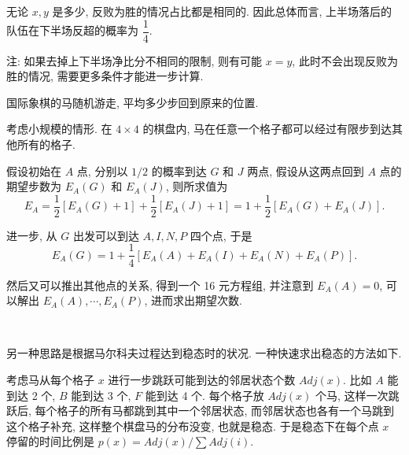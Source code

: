 无论 $x,y$ 是多少, 反败为胜的情况占比都是相同的. 因此总体而言, 上半场落后的队伍在下半场反超的概率为 $\dfrac{1}{4}$.

注: 如果去掉上下半场净比分不相同的限制, 则有可能 $x=y$, 此时不会出现反败为胜的情况, 需要更多条件才能进一步计算.


\newpage

国际象棋的马随机游走, 平均多少步回到原来的位置.
\begin{figure*}[htbp]
\centering
{}
\end{figure*}

考虑小规模的情形. 在 $ 4\times 4 $ 的棋盘内, 马在任意一个格子都可以经过有限步到达其他所有的格子. 

假设初始在 $ A $ 点, 分别以 $ 1/2 $ 的概率到达 $ G $ 和 $ J $ 两点, 假设从这两点回到 $ A $ 点的期望步数为 $ E_A(G) $ 和 $ E_A(J) $, 则所求值为 
\[ E_A = \frac{1}{2}[E_A(G) + 1] + \frac{1}{2}[E_A(J)+1] = 1 + \frac{1}{2}[E_A(G)+E_A(J)]. \]

进一步, 从 $ G $ 出发可以到达 $ A, I, N, P $ 四个点, 于是
\[ E_A(G)= 1+\frac{1}{4}[ E_A(A) + E_A(I) + E_A(N) + E_A(P) ]. \]

然后又可以推出其他点的关系, 得到一个 16 元方程组, 并注意到 $ E_A(A)=0 $, 可以解出 $ E_A(A),\cdots,E_A(P) $, 进而求出期望次数.

~

另一种思路是根据马尔科夫过程达到稳态时的状况. 一种快速求出稳态的方法如下. 

考虑马从每个格子 $ x $ 进行一步跳跃可能到达的邻居状态个数 $ Adj(x) $. 比如 $ A $ 能到达 2 个, $ B $ 能到达 3 个, $ F $ 能到达 4 个. 每个格子放 $ Adj(x) $ 个马, 这样一次跳跃后, 每个格子的所有马都跳到其中一个邻居状态, 而邻居状态也各有一个马跳到这个格子补充, 这样整个棋盘马的分布没变, 也就是稳态. 于是稳态下在每个点 $ x $ 停留的时间比例是 $ p(x) = Adj(x)/\sum{Adj(i)} $.  

